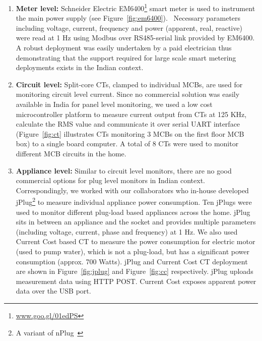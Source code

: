 \documentclass[10pt]{sensys-proc}
\newcommand{\figref}[1]{Figure~\ref{#1}}
\newcommand{\denselistbib}{
  \itemsep -.6pt\topsep-4pt\partopsep-20pt
}
\begin{document}
\begin{enumerate}\denselistbib
\vspace{-1.5mm}\item \textbf{Meter level:} Schneider Electric EM6400\footnote{\url{www.goo.gl/01edPS}} smart meter is used to instrument the main power supply (see \figref{fig:em6400}).%
~Necessary parameters including voltage, current, frequency and power (apparent, real, reactive) were read at 1 Hz using Modbus over RS485-serial link provided by EM6400. A robust deployment was easily undertaken by a paid electrician thus demonstrating that the support required for large scale smart metering deployments exists in the Indian context. 

\vspace{-1.5mm} \item \textbf{Circuit level:} Split-core CTs, clamped to individual MCBs, are used for monitoring circuit level current. Since no commercial solution was easily available in India for panel level monitoring, we used a low cost microcontroller platform to measure current output from CTs at 125 KHz, calculate the RMS value and communicate it over serial UART interface (\figref{fig:ct} illustrates CTs monitoring 3 MCBs on the first floor MCB box) to a single board computer. A total of 8 CTs were used to monitor different MCB circuits in the home.

\vspace{-1.5mm} \item \textbf{Appliance level:} Similar to circuit level monitors, there are no good commercial options for plug level monitors in Indian context. Correspondingly, we worked with our collaborators who in-house developed jPlug\footnote{A variant of nPlug~\cite{nplug}} to measure individual appliance power consumption. Ten jPlugs were used to monitor different plug-load based appliances across the home. jPlug sits in between an appliance and the socket and provides multiple parameters (including voltage, current, phase and frequency) at 1 Hz. We also used Current Cost based CT to measure the power consumption for electric motor (used to pump water), which is not a plug-load, but has a significant power consumption (approx. 700 Watts). jPlug and Current Cost CT deployment are shown in \figref{fig:jplug} and \figref{fig:cc} respectively. jPlug uploads measurement data using HTTP POST. Current Cost exposes apparent power data over the USB port. 
\end{enumerate}
\end{document}

